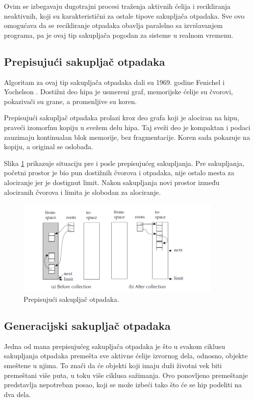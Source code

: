 Ovim se izbegavaju dugotrajni procesi traženja aktivnih ćelija i recikliranja neaktivnih, koji su karakteristični za ostale tipove sakupljača otpadaka. Sve ovo omogućava da se recikliranje otpadaka obavlja paralelno sa izvršavanjem programa, pa je ovaj tip sakupljača pogodan za sisteme u realnom vremenu.

\subsection{Prepisujući sakupljač otpadaka}

Algoritam za ovaj tip sakupljača otpadaka dali su 1969. godine Fenichel i
Yochelson \cite{feni69}. Dostižni deo hipa je usmereni graf, memorijske ćelije su čvorovi, pokazivači su grane, a promenljive su koren.

Prepisujući sakupljač otpadaka prolazi kroz deo grafa koji je alociran na hipu, praveći izomorfnu kopiju u svežem delu hipa. Taj sveži deo je kompaktan i podaci zauzimaju kontinualan blok memorije, bez fragmentacije. Koren sada pokazuje na kopiju, a original se oslobađa. 

Slika \ref{fig:copygc} prikazuje situaciju pre i posle prepisujućeg sakupljanja. Pre sakupljanja, početni prostor je bio pun dostižnih čvorova i otpadaka, nije ostalo mesta za alociranje jer je dostignut limit. Nakon sakupljanja novi prostor između alociranih čvorova i limita je slobodan za alociranje.

\begin{figure}[h]
	\centering
	\includegraphics[width=0.9\textwidth]{copygc.png}
	\caption{Prepisujući sakupljač otpadaka.}
	\label{fig:copygc}
\end{figure}

\subsection{Generacijski sakupljač otpadaka}

Jedna od mana prepisujućeg sakupljača otpadaka je što u svakom ciklusu sakupljanja otpadaka premešta sve aktivne ćelije izvornog dela, odnosno, objekte smeštene u njima. To znači da će objekti koji imaju duži životni vek biti premeštani više puta, u toku više ciklusa sažimanja. Ovo ponovljeno premeštanje predstavlja nepotreban posao, koji se može izbeći tako što će se hip podeliti na dva dela.

